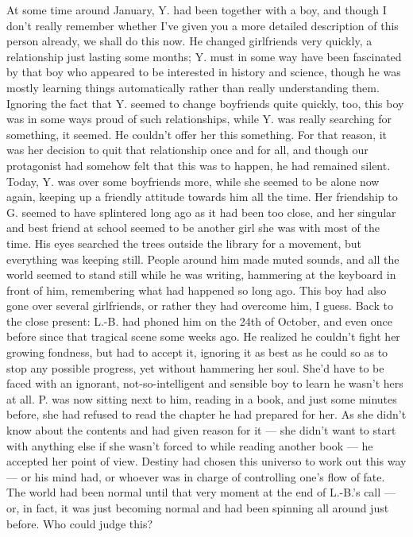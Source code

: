 At some time around January, Y. had been together with a boy, and though I don't really remember whether I've given you a more detailed description of this person already, we shall do this now. He changed girlfriends very quickly, a relationship just lasting some months; Y. must in some way have been fascinated by that boy who appeared to be interested in history and science, though he was mostly learning things automatically rather than really understanding them. Ignoring the fact that Y. seemed to change boyfriends quite quickly, too, this boy was in some ways proud of such relationships, while Y. was really searching for something, it seemed. He couldn't offer her this something. 
For that reason, it was her decision to quit that relationship once and for all, and though our protagonist had somehow felt that this was to happen, he had remained silent. Today, Y. was over some boyfriends more, while she seemed to be alone now again, keeping up a friendly attitude towards him all the time. Her friendship to G. seemed to have splintered long ago as it had been too close, and her singular and best friend at school seemed to be another girl she was with most of the time. 
His eyes searched the trees outside the library for a movement, but everything was keeping still. People around him made muted sounds, and all the world seemed to stand still while he was writing, hammering at the keyboard in front of him, remembering what had happened so long ago. This boy had also gone over several girlfriends, or rather they had overcome him, I guess. 
Back to the close present: L.-B. had phoned him on the 24th of October, and even once before since that tragical scene some weeks ago. He realized he couldn't fight her growing fondness, but had to accept it, ignoring it as best as he could so as to stop any possible progress, yet without hammering her soul. She'd have to be faced with an ignorant, not-so-intelligent and sensible boy to learn he wasn't hers at all. 
P. was now sitting next to him, reading in a book, and just some minutes before, she had refused to read the chapter he had prepared for her. As she didn't know about the contents and had given reason for it --- she didn't want to start with anything else if she wasn't forced to while reading another book --- he accepted her point of view. Destiny had chosen this universo to work out this way --- or his mind had, or whoever was in charge of controlling one's flow of fate. 
The world had been normal until that very moment at the end of L.-B.'s call --- or, in fact, it was just becoming normal and had been spinning all around just before. Who could judge this? 

